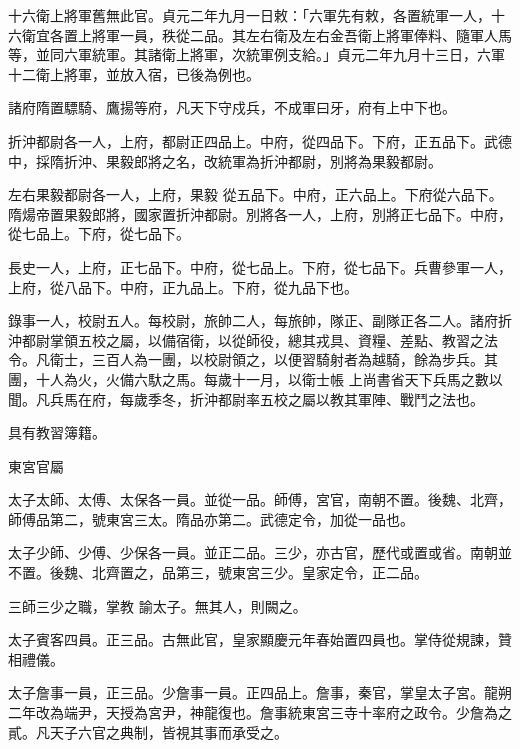 \begin{pinyinscope}
 十六衛上將軍舊無此官。貞元二年九月一日敕：「六軍先有敕，各置統軍一人，十六衛宜各置上將軍一員，秩從二品。其左右衛及左右金吾衛上將軍俸料、隨軍人馬等，並同六軍統軍。其諸衛上將軍，次統軍例支給。」貞元二年九月十三日，六軍十二衛上將軍，並放入宿，已後為例也。



 諸府隋置驃騎、鷹揚等府，凡天下守戍兵，不成軍曰牙，府有上中下也。



 折沖都尉各一人，上府，都尉正四品上。中府，從四品下。下府，正五品下。武德中，採隋折沖、果毅郎將之名，改統軍為折沖都尉，別將為果毅都尉。



 左右果毅都尉各一人，上府，果毅
 從五品下。中府，正六品上。下府從六品下。隋煬帝置果毅郎將，國家置折沖都尉。別將各一人，上府，別將正七品下。中府，從七品上。下府，從七品下。



 長史一人，上府，正七品下。中府，從七品上。下府，從七品下。兵曹參軍一人，上府，從八品下。中府，正九品上。下府，從九品下也。



 錄事一人，校尉五人。每校尉，旅帥二人，每旅帥，隊正、副隊正各二人。諸府折沖都尉掌領五校之屬，以備宿衛，以從師役，總其戎具、資糧、差點、教習之法令。凡衛士，三百人為一團，以校尉領之，以便習騎射者為越騎，餘為步兵。其團，十人為火，火備六馱之馬。每歲十一月，以衛士帳
 上尚書省天下兵馬之數以聞。凡兵馬在府，每歲季冬，折沖都尉率五校之屬以教其軍陣、戰鬥之法也。



 具有教習簿籍。



 東宮官屬



 太子太師、太傅、太保各一員。並從一品。師傅，宮官，南朝不置。後魏、北齊，師傅品第二，號東宮三太。隋品亦第二。武德定令，加從一品也。



 太子少師、少傅、少保各一員。並正二品。三少，亦古官，歷代或置或省。南朝並不置。後魏、北齊置之，品第三，號東宮三少。皇家定令，正二品。



 三師三少之職，掌教
 諭太子。無其人，則闕之。



 太子賓客四員。正三品。古無此官，皇家顯慶元年春始置四員也。掌侍從規諫，贊相禮儀。



 太子詹事一員，正三品。少詹事一員。正四品上。詹事，秦官，掌皇太子宮。龍朔二年改為端尹，天授為宮尹，神龍復也。詹事統東宮三寺十率府之政令。少詹為之貳。凡天子六官之典制，皆視其事而承受之。




\end{pinyinscope}
